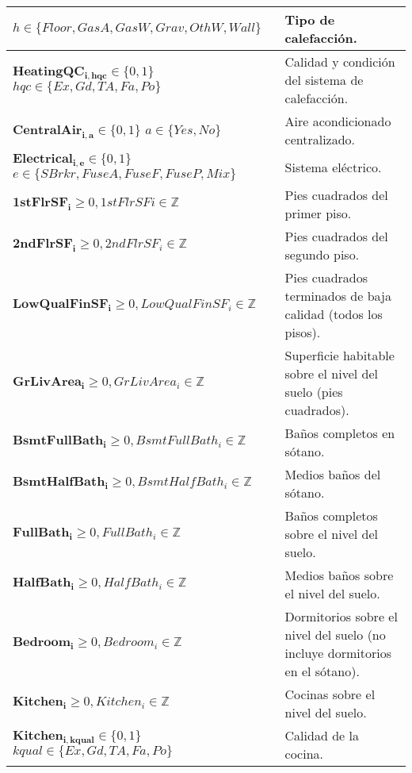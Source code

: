 \begin{longtable}{ | p{8cm} | p{5cm} | }
    $h \in \{Floor, GasA, GasW, Grav, OthW, Wall\}$ & Tipo de calefacción.\\
    \hline
    $\boldsymbol{HeatingQC_{i,hqc}} \in \{0, 1\}$\newline $hqc \in \{Ex, Gd, TA, Fa, Po\}$ & Calidad y condición del sistema de calefacción.\\
    \hline    
    $\boldsymbol{CentralAir_{i,a}} \in \{0, 1\}$ \newline 
    $a \in \{Yes, No\}$ & Aire acondicionado centralizado.\\
    \hline
    $\boldsymbol{Electrical_{i,e}} \in \{0, 1\}$\newline 
    $e \in \{SBrkr, FuseA, FuseF, FuseP, Mix\}$ & Sistema eléctrico.\\
    \hline
    $\boldsymbol{1stFlrSF_{i}} \geq 0, 1stFlrSF{i} \in \mathbb{Z}$ & Pies cuadrados del primer piso.\\
    \hline
    $\boldsymbol{2ndFlrSF_{i}} \geq 0, 2ndFlrSF_{i} \in \mathbb{Z}$ & Pies cuadrados del segundo piso.\\
    \hline
    $\boldsymbol{LowQualFinSF_{i}} \geq 0, LowQualFinSF_{i} \in \mathbb{Z}$ & Pies cuadrados terminados de baja calidad (todos los pisos).\\
    \hline
    $\boldsymbol{GrLivArea_{i}} \geq 0, GrLivArea_{i} \in \mathbb{Z}$ & Superficie habitable sobre el nivel del suelo (pies cuadrados).\\
    \hline
    $\boldsymbol{BsmtFullBath_{i}} \geq 0, BsmtFullBath_{i} \in \mathbb{Z}$ & Baños completos en sótano.\\
    \hline
    $\boldsymbol{BsmtHalfBath_{i}} \geq 0, BsmtHalfBath_{i} \in \mathbb{Z}$ & Medios baños del sótano.\\
    \hline
    $\boldsymbol{FullBath_{i}} \geq 0, FullBath_{i} \in \mathbb{Z}$ & Baños completos sobre el nivel del suelo.\\
    \hline
    $\boldsymbol{HalfBath_{i}} \geq 0, HalfBath_{i} \in \mathbb{Z}$ & Medios baños sobre el nivel del suelo.\\
    \hline
    $\boldsymbol{Bedroom_{i}} \geq 0, Bedroom_{i} \in \mathbb{Z}$ & Dormitorios sobre el nivel del suelo (no incluye dormitorios en el sótano).\\
    \hline
    $\boldsymbol{Kitchen_{i} }\geq 0, Kitchen_{i} \in \mathbb{Z}$ & Cocinas sobre el nivel del suelo.\\
    \hline
    $\boldsymbol{Kitchen_{i,kqual}} \in \{0, 1\}$ \newline $kqual \in \{Ex, Gd, TA, Fa, Po\}$ & Calidad de la cocina.\\

\end{longtable}
